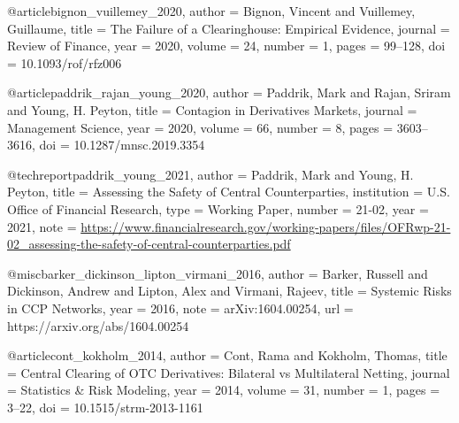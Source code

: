 

@article{bignon_vuillemey_2020,
  author  = {Bignon, Vincent and Vuillemey, Guillaume},
  title   = {The Failure of a Clearinghouse: Empirical Evidence},
  journal = {Review of Finance},
  year    = {2020}, volume = {24}, number = {1}, pages = {99--128},
  doi     = {10.1093/rof/rfz006}
}


@article{paddrik_rajan_young_2020,
  author  = {Paddrik, Mark and Rajan, Sriram and Young, H. Peyton},
  title   = {Contagion in Derivatives Markets},
  journal = {Management Science},
  year    = {2020}, volume = {66}, number = {8}, pages = {3603--3616},
  doi     = {10.1287/mnsc.2019.3354}
}


@techreport{paddrik_young_2021,
  author      = {Paddrik, Mark and Young, H. Peyton},
  title       = {Assessing the Safety of Central Counterparties},
  institution = {U.S. Office of Financial Research}, type = {Working Paper},
  number      = {21-02}, year = {2021},
  note        = {\url{https://www.financialresearch.gov/working-papers/files/OFRwp-21-02_assessing-the-safety-of-central-counterparties.pdf}}
}


@misc{barker_dickinson_lipton_virmani_2016,
  author = {Barker, Russell and Dickinson, Andrew and Lipton, Alex and Virmani, Rajeev},
  title  = {Systemic Risks in {CCP} Networks},
  year   = {2016},
  note   = {arXiv:1604.00254},
  url    = {https://arxiv.org/abs/1604.00254}
}


@article{cont_kokholm_2014,
  author  = {Cont, Rama and Kokholm, Thomas},
  title   = {Central Clearing of {OTC} Derivatives: Bilateral vs Multilateral Netting},
  journal = {Statistics \& Risk Modeling},
  year    = {2014}, volume = {31}, number = {1}, pages = {3--22},
  doi     = {10.1515/strm-2013-1161}
}


